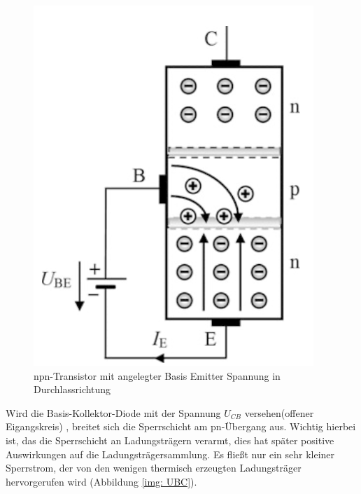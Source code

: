 \begin{figure}[!htb]
	\centering
	\includegraphics[scale=0.8]{images/UBEUebergang.png} 
	\caption{npn-Transistor mit angelegter Basis Emitter Spannung in Durchlassrichtung			\cite{Stiny2018}}
	\label{img: UBE}
	\end{figure}
	
	
Wird die Basis-Kollektor-Diode mit der Spannung $U_{CB}$ versehen(offener Eigangskreis) , breitet sich die Sperrschicht am pn-Übergang aus. Wichtig hierbei ist, das die Sperrschicht an Ladungsträgern verarmt, dies hat später positive Auswirkungen auf die Ladungsträgersammlung. Es fließt nur ein sehr kleiner Sperrstrom, der von den wenigen thermisch erzeugten Ladungsträger hervorgerufen wird (Abbildung \ref{img: UBC}). 	


